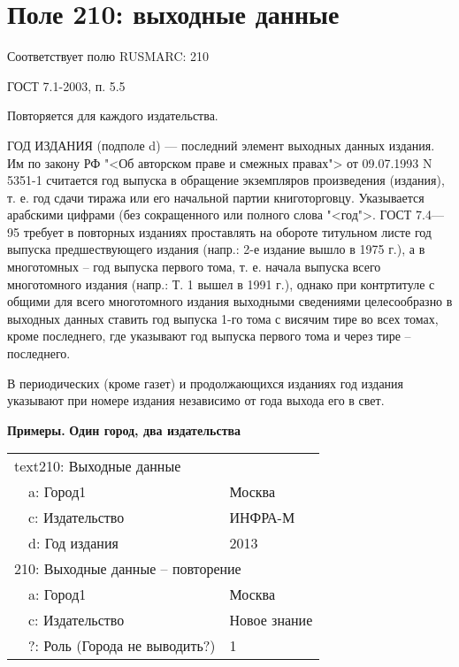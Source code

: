 \chapter{Поле 210: выходные данные}

Соответствует полю RUSMARC: 210

ГОСТ 7.1-2003, п. 5.5

Повторяется для каждого издательства.

ГОД ИЗДАНИЯ (подполе d) — последний элемент выходных данных издания. Им по закону РФ "<Об авторском праве и смежных правах"> от 09.07.1993 N 5351-1 считается год выпуска в обращение экземпляров произведения (издания), т. е. год сдачи тиража или его начальной партии книготорговцу. Указывается арабскими цифрами (без сокращенного или полного слова "<год">. ГОСТ 7.4—95 требует в повторных изданиях проставлять на обороте титульном листе год выпуска предшествующего издания (напр.: 2-е издание вышло в 1975 г.), а в многотомных -- год выпуска первого тома, т. е. начала выпуска всего многотомного издания (напр.: Т. 1 вышел в 1991 г.), однако при контртитуле с общими для всего многотомного издания выходными сведениями целесообразно в выходных данных ставить год выпуска 1-го тома с висячим тире во всех томах, кроме последнего, где указывают год выпуска первого тома и через тире -- последнего.

В периодических (кроме газет) и продолжающихся изданиях год издания указывают при номере издания независимо от года выхода его в свет.

\textbf{Примеры.} \textbf{Один город, два издательства}

\begin{tabular}{| l | l | l |}
	\hline
	\thead{Поле} & \thead{Подполе} & \thead{Значение} \\
	\hline
	\multicolumn{3}{|l|}{text210: Выходные данные} \\
	\hline
	& a: Город1 & Москва \\
	\hline
	& c: Издательство & ИНФРА-М \\
	\hline
	& d: Год издания & 2013 \\
	\hline
	\multicolumn{3}{|l|}{210: Выходные данные -- повторение} \\
	\hline
	& a: Город1 & Москва \\
	\hline
	& c: Издательство & Новое знание \\
	\hline
	& ?: Роль (Города не выводить?) & 1 \\
	\hline
\end{tabular}

